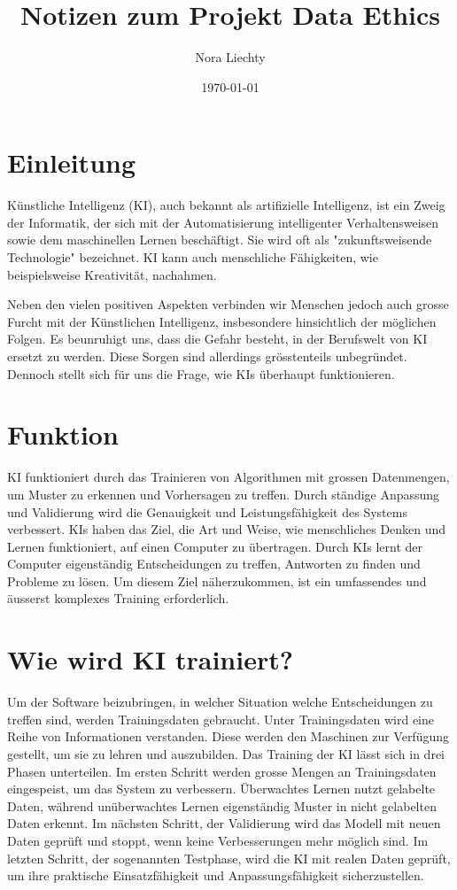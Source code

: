 \documentclass{article}
\title{Notizen zum Projekt Data Ethics}
\author{Nora Liechty}
\date{\today}
\begin{document}
\maketitle


\tableofcontents

\section{Einleitung}

Künstliche Intelligenz (KI), auch bekannt als artifizielle Intelligenz, ist ein Zweig der Informatik, der sich mit der Automatisierung intelligenter Verhaltensweisen sowie dem maschinellen Lernen beschäftigt. Sie wird oft als "zukunftsweisende Technologie" bezeichnet. KI kann auch menschliche Fähigkeiten, wie beispielsweise Kreativität, nachahmen.

Neben den vielen positiven Aspekten verbinden wir Menschen jedoch auch grosse Furcht mit der Künstlichen Intelligenz, insbesondere hinsichtlich der möglichen Folgen. Es beunruhigt uns, dass die Gefahr besteht, in der Berufswelt von KI ersetzt zu werden. Diese Sorgen sind allerdings grösstenteils unbegründet.
Dennoch stellt sich für uns die Frage, wie KIs überhaupt funktionieren. 
 
\section{Funktion}

KI funktioniert durch das Trainieren von Algorithmen mit grossen Datenmengen, um Muster zu erkennen und Vorhersagen zu treffen. Durch ständige Anpassung und Validierung wird die Genauigkeit und Leistungsfähigkeit des Systems verbessert. KIs haben das Ziel, die Art und Weise, wie menschliches Denken und Lernen funktioniert, auf einen Computer zu übertragen. Durch KIs lernt der Computer eigenständig Entscheidungen zu treffen, Antworten zu finden und Probleme zu lösen. Um diesem Ziel näherzukommen, ist ein umfassendes und äusserst komplexes Training erforderlich.

\section{Wie wird KI trainiert?}

Um der Software beizubringen, in welcher Situation welche Entscheidungen zu treffen sind, werden Trainingsdaten gebraucht. Unter Trainingsdaten wird eine Reihe von Informationen verstanden. Diese werden den Maschinen zur Verfügung gestellt, um sie zu lehren und auszubilden. 
Das Training der KI lässt sich in drei Phasen unterteilen. Im ersten Schritt werden grosse Mengen an Trainingsdaten eingespeist, um das System zu verbessern. Überwachtes Lernen nutzt gelabelte Daten, während unüberwachtes Lernen eigenständig Muster in nicht gelabelten Daten erkennt.
Im nächsten Schritt, der Validierung wird das Modell mit neuen Daten geprüft und stoppt, wenn keine Verbesserungen mehr möglich sind. Im letzten Schritt, der sogenannten Testphase, wird die KI mit realen Daten geprüft, um ihre praktische Einsatzfähigkeit und Anpassungsfähigkeit sicherzustellen.
\end{document}

